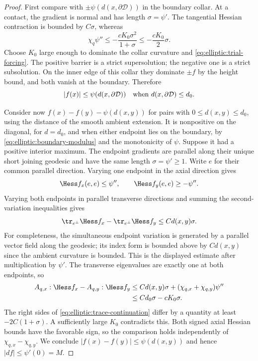 \begin{proof}
First compare with $\pm\psi(d(x,\partial\mathcal D))$ in the boundary collar.
At a contact, the gradient is normal and has length $\sigma=\psi'$.
The tangential Hessian contraction is bounded by $C\sigma$, whereas
\[
 \chi_q\psi''\le-\frac{cK_0\sigma^2}{1+\sigma}
                         \le-\frac{cK_0}2\sigma.
\]
Choose $K_0$ large enough to dominate the collar curvature and
\eqref{eq:elliptic:trial-forcing}.  The positive barrier is a
strict supersolution; the negative one is a strict subsolution.  On
the inner edge of this collar they dominate $\pm f$ by the height
bound, and both vanish at the boundary.  Therefore
\begin{equation}\label{eq:elliptic:boundary-modulus}
 |f(x)|\le\psi(d(x,\partial\mathcal D))
 \quad\hbox{when }d(x,\partial\mathcal D)\le d_0.
\end{equation}

Consider now $f(x)-f(y)-\psi(d(x,y))$ for pairs with
$0\le d(x,y)\le d_0$, using the distance of the smooth ambient
extension.  It is nonpositive on the diagonal, for $d=d_0$, and when
either endpoint lies on the boundary, by
\eqref{eq:elliptic:boundary-modulus} and the monotonicity of
$\psi$.  Suppose it had a positive interior maximum.  The endpoint
gradients are parallel along their unique short joining geodesic and
have the same length $\sigma=\psi'\ge1$.  Write $e$ for their common
parallel direction.  Varying one endpoint in the axial direction
gives
\[
 \Hess f_x(e,e)\le\psi'',\qquad
 \Hess f_y(e,e)\ge-\psi''.
\]
Varying both endpoints in parallel transverse directions and summing
the second-variation inequalities gives
\[
 \tr_{e^\perp}\Hess f_x-
 \tr_{e^\perp}\Hess f_y\le C d(x,y)\sigma.
\]
For completeness, the simultaneous endpoint variation is generated
by a parallel vector field along the geodesic; its index form is
bounded above by $C d(x,y)$ since the ambient curvature is bounded.
This is the displayed estimate after multiplication by $\psi'$.
The transverse eigenvalues are exactly one at both endpoints, so
\begin{align*}
 A_{q,x}:\Hess f_x-A_{q,y}:\Hess f_y
 &\le Cd(x,y)\sigma+(\chi_{q,x}+\chi_{q,y})\psi''\\
 &\le Cd_0\sigma-cK_0\sigma.
\end{align*}
The right sides of \eqref{eq:elliptic:trace-continuation}
differ by a quantity at least $-2C(1+\sigma)$.
A sufficiently large $K_0$ contradicts this.  Both signed axial Hessian
bounds have the favorable sign, so the comparison holds independently
of $\chi_{q,x}-\chi_{q,y}$.  We conclude
$|f(x)-f(y)|\le\psi(d(x,y))$ and hence $|df|\le\psi'(0)=M$.


\end{proof}
